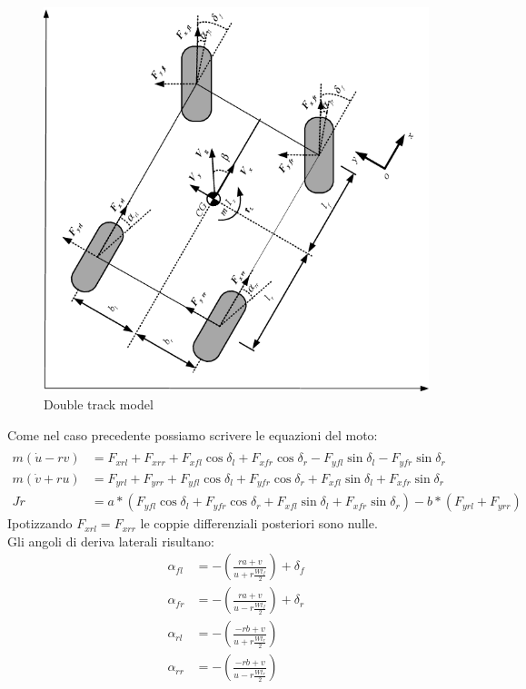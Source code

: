 \begin{figure}[ht]
    \centering
    \includegraphics[scale=0.4]{Immagini/Lateral dynamics/Double-track-model-of-vehicle-lateral-dynamics.png}
    \caption{Double track model}
    \label{fig:Double track model}
\end{figure}
Come nel caso precedente possiamo scrivere le equazioni del moto: 
\begin{align}
\\
m(\dot u- rv) & = F_{xrl} + F_{xrr} + F_{xfl} \cos \delta_l + F_{xfr} \cos \delta_r -F_{yfl} \sin \delta_l -F_{yfr} \sin \delta_r\\
m(\dot v+ ru) & = F_{yrl} + F_{yrr} + F_{yfl} \cos \delta_l + F_{yfr} \cos \delta_r +F_{xfl} \sin \delta_l +F_{xfr} \sin \delta_r\\
J\dot r & = a*(F_{yfl} \cos \delta_l + F_{yfr} \cos \delta_r +F_{xfl} \sin \delta_l +F_{xfr} \sin \delta_r)-b*(F_{yrl} + F_{yrr})
\end{align}
Ipotizzando $F_{xrl}=F_{xrr}$ le coppie differenziali posteriori sono nulle.\\
Gli angoli di deriva laterali risultano:
\begin{align}
\alpha_{fl} & = - (\frac{ra+v}{u+r\frac{Wt_{f}}{2}}) + \delta_f\\
\alpha_{fr} & = - (\frac{ra+v}{u-r\frac{Wt_{f}}{2}}) + \delta_r\\
\alpha_{rl} & = - (\frac{-rb+v}{u+r\frac{Wt_{r}}{2}})\\
\alpha_{rr} & = - (\frac{-rb+v}{u-r\frac{Wt_{r}}{2}})
\end{align}



